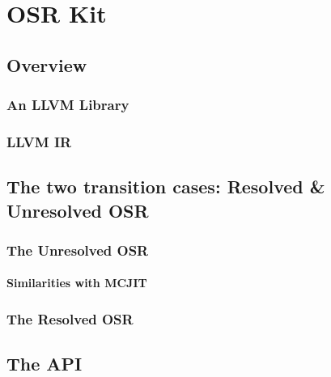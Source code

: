 
\chapter{OSR Kit} %

\label{Chapter4} %


\newcommand{\keyword}[1]{\textbf{#1}}
\newcommand{\tabhead}[1]{\textbf{#1}}
\newcommand{\code}[1]{\texttt{#1}}
\newcommand{\file}[1]{\texttt{\bfseries#1}}
\newcommand{\option}[1]{\texttt{\itshape#1}}

\section{Overview}
\subsection{An LLVM Library}
\subsection{LLVM IR}

\section{The two transition cases: Resolved \& Unresolved OSR}
\subsection{The Unresolved OSR}
\subsubsection{Similarities with MCJIT}

\subsection{The Resolved OSR}

\section{The API}
